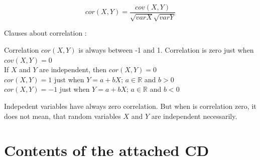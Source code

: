 \documentclass[11pt,twoside,a4paper]{book}
\begin{document}
$$cor(X,Y)=\frac{cov(X,Y)}{\sqrt{var X}\sqrt{var Y}}$$ 

Clauses about correlation \cite{kulich:stat}:

\begin{center}
Correlation $cor(X,Y)$ is always between -1 and 1. Correlation is zero just when
$cov(X,Y)=0$\\
If $X$ and $Y$ are independent, then $cor(X,Y)=0$\\
$cor(X,Y)=1$ just when $Y=a+bX$; $a\in\mathbb{R}$ and $b>0$\\
$cor(X,Y)=-1$ just when $Y=a+bX$; $a\in\mathbb{R}$ and $b<0$\\
\end{center}

Indepedent variables have always zero correlation. But when is correlation
zero, it does not mean, that random variables $X$ and $Y$ are independent
necessarily.

\chapter{Contents of the attached CD}






\end{document}
